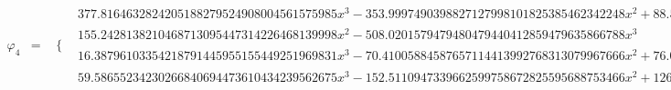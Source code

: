 \documentclass{article}
\begin{document}
\begin{landscape}
\begin{eqnarray*}
\begin{array}{cc}
\end{array}\\
\varphi_4 & = & \begin{array}{cc}
 \{ & 
\begin{array}{cc}
 377.8164632824205188279524908004561575985 x^3-353.9997490398827127998101825385462342248 x^2+88.52691494977068578492862384026782206031 x-4.145265765359081295209876599186448505372 & x\geq \frac{1}{4}\land x<\frac{1}{2} \\
 155.2428138210468713095447314226468139998 x^2-508.0201579479480479440412859479635866788 x^3 & x\geq 0\land x<\frac{1}{4} \\
 16.38796103354218791445955155449251969831 x^3-70.41005884587657114413992768313079967666 x^2+76.00860144242329231437807341932511593728 x-23.60496877907712860966554769682349934338 & x\geq \frac{1}{2}\land x<\frac{3}{4} \\
 59.58655234230266840694473610434239562675 x^3-152.5110947339662599758672825595688753466 x^2+126.2625324410245147309003568061105638129 x-33.33799004936092316197781035088408409310 & x\geq \frac{3}{4}\land x<1
\end{array}


\end{array}
\end{eqnarray*}
\end{landscape}
\end{document}
